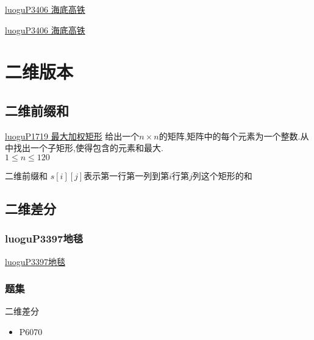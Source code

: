 \documentclass[aspectratio=169,xcolor=dvipsnames]{beamer}
\begin{document}
\begin{frame}{\href{https://www.luogu.com.cn/problem/P3406}{luoguP3406 海底高铁}}

    \href{https://www.luogu.com.cn/problem/P3406}{luoguP3406 海底高铁}

\end{frame}

\section{二维版本}
\subsection{二维前缀和}
\begin{frame}{\href{https://www.luogu.com.cn/problem/P1719}{luoguP1719 最大加权矩形}}
    给出一个$n \times n$的矩阵,矩阵中的每个元素为一个整数.从中找出一个子矩形,使得包含的元素和最大.\\
    $1 \le n \le 120$

    \begin{alertblock}{}
        二维前缀和
        $s[i][j]$表示第一行第一列到第$i$行第$j$列这个矩形的和
    \end{alertblock}
\end{frame}


\subsection{二维差分}
\begin{frame}
    \frametitle{luoguP3397地毯}

    \href{https://www.luogu.com.cn/problem/P3397}{luoguP3397地毯}

\end{frame}

\begin{frame}
    \frametitle{题集}
    二维差分
    \begin{itemize}
        \item P6070
    \end{itemize}

\end{frame}
\end{document}
